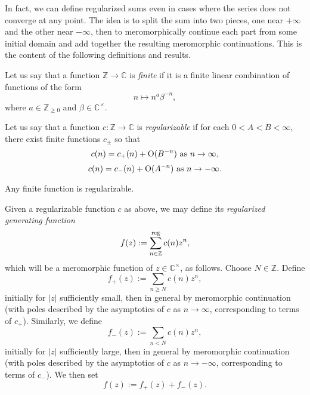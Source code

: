 \documentclass[reqno]{amsart}  \numberwithin{theorem}{section} \numberwithin{equation}{section}
\begin{document}
In fact, we can define regularized sums even in cases where the series does not converge at any point.  The idea is to split the sum into two pieces, one near $+\infty$ and the other near $-\infty$, then to meromorphically continue each part from some initial domain and add together the resulting meromorphic continuations.  This is the content of the following definitions and results.
\begin{definition}
  Let us say that a function $\mathbb{Z} \rightarrow \mathbb{C}$ is \emph{finite} if it is a finite linear combination of functions of the form
  \begin{equation*}
    n \mapsto n^a \beta^{- n},
  \end{equation*}
  where $a \in \mathbb{Z}_{\geq 0}$ and $\beta \in \mathbb{C}^\times$.
\end{definition}
\begin{definition}
  Let us say that a function $c : \mathbb{Z} \rightarrow \mathbb{C}$ is \emph{regularizable} if for each $0 < A < B < \infty$, there exist finite functions $c_{\pm}$ so that
  \begin{equation*}
    c(n) = c_+(n) + \operatorname{O}(B^{-n}) \text{ as } n \rightarrow \infty,
  \end{equation*}
  \begin{equation*}
    c(n) = c_-(n) + \operatorname{O}(A^{-n}) \text{ as } n \rightarrow -\infty.
  \end{equation*}
\end{definition}
\begin{example}
Any finite function is regularizable.
\end{example}
\begin{definition}\label{definition:cj4ss5ec2g}
  Given a regularizable function $c$ as above, we may define its \emph{regularized generating function}
  \begin{equation}\label{eq:cj4ss5ffxd}
    f(z) := \sum_{n \in \mathbb{Z} }^{\operatorname{reg}} c(n) z^n,
  \end{equation}
  which will be a meromorphic function of $z \in \mathbb{C}^\times$, as follows.  Choose $N \in \mathbb{Z}$.  Define
  \begin{equation*}
    f_+(z) := \sum_{n \geq N} c(n) z^n,
  \end{equation*}
  initially for $\lvert z \rvert$ sufficiently small, then in general by meromorphic continuation (with poles described by the asymptotics of $c$ as $n \rightarrow \infty$, corresponding to terms of $c_+$).  Similarly, we define
  \begin{equation*}
    f_-(z) := \sum_{n < N} c(n) z^n,
  \end{equation*}
  initially for $\lvert z \rvert$ sufficiently large, then in general by meromorphic continuation (with poles described by the asymptotics of $c$ as $n \rightarrow -\infty$, corresponding to terms of $c_-$).  We then set
  \begin{equation*}
    f(z) := f_+(z) + f_-(z).
  \end{equation*}
\end{definition}
\end{document}
